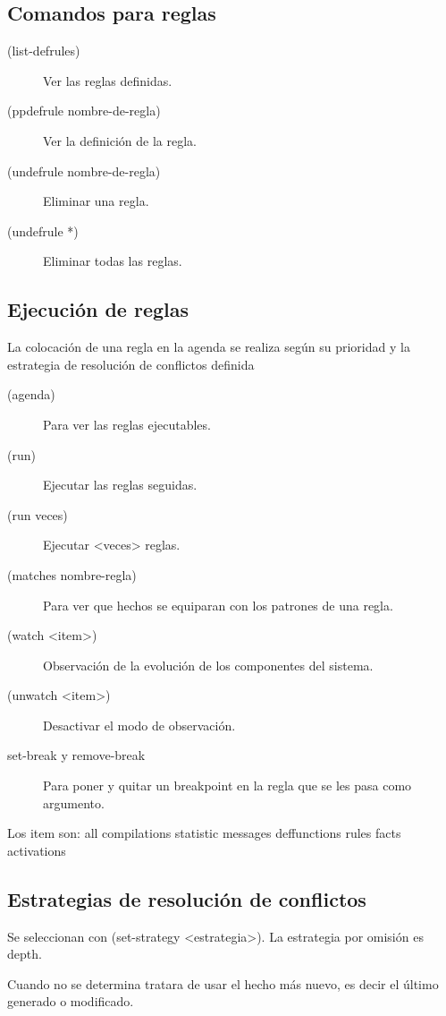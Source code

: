\documentclass[12pt, twoside, openright]{report} %
\begin{document}
\subsection{Comandos para reglas}
\begin{description}
	\item[(list-defrules)] Ver las reglas definidas.
	\item[(ppdefrule nombre-de-regla)] Ver la definición de la regla.
	\item[(undefrule nombre-de-regla)] Eliminar una regla.
	\item[(undefrule *)] Eliminar todas las reglas.
\end{description}

\subsection{Ejecución de reglas}
La colocación de una regla en la agenda se realiza según su prioridad y la estrategia de resolución de conflictos definida

\begin{description}
	\item[(agenda)] Para ver las reglas ejecutables.
	\item[(run)] Ejecutar las reglas seguidas.
	\item[(run veces)] Ejecutar <veces> reglas.
	\item[(matches nombre-regla)] Para ver que hechos se equiparan con los patrones de una regla.
	\item[(watch <item>)] Observación de la evolución de los componentes del sistema.
	\item[(unwatch <item>)] Desactivar el modo de observación.
	\item[set-break y remove-break] Para poner y quitar un breakpoint en la regla
	      que se les pasa como argumento.
\end{description}

Los item son: all compilations statistic messages deffunctions rules facts activations

\subsection{Estrategias de resolución de conflictos}
Se seleccionan con (set-strategy <estrategia>). La estrategia por omisión es depth.

Cuando no se determina tratara de usar el hecho más nuevo, es decir el último generado o modificado.
\end{document}

